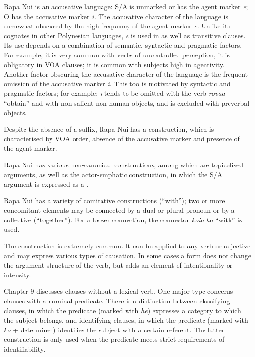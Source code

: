 Rapa Nui is an accusative language: S/A is unmarked or has the agent marker \textit{e}; O has the accusative marker \textit{i.} The accusative character of the language is somewhat obscured by the high frequency of the agent marker \textit{e}. Unlike its cognates in other Polynesian languages, \textit{e} is used in  as well as transitive clauses. Its use depends on a combination of semantic, syntactic and pragmatic factors. For example, it is very common with verbs of uncontrolled perception; it is obligatory in VOA clauses; it is common with subjects high in agentivity. Another factor obscuring the accusative character of the language is the frequent omission of the accusative marker \textit{i}. This too is motivated by syntactic and pragmatic factors; for example: \textit{i} tends to be omitted with the verb \textit{rova{\ꞌ}a} “obtain” and with non-salient non-human objects, and is excluded with preverbal objects.

Despite the absence of a  suffix, Rapa Nui has a  construction, which is characterised by VOA order, absence of the accusative marker and presence of the agent marker. 

Rapa Nui has various non-canonical constructions, among which are topicalised arguments, as well as the actor-emphatic construction, in which the S/A argument is expressed as a .

Rapa Nui has a variety of comitative constructions (“with”); two or more concomitant elements may be connected by a dual or plural pronoun or by a collective  (“together”). For a looser connection, the connector \textit{koia ko} “with” is used. 

The  construction is extremely common. It can be applied to any verb or adjective and may express various types of causation. In some cases a  form does not change the argument structure of the verb, but adds an element of intentionality or intensity.

\medskip Chapter 9 discusses clauses without a lexical verb. One major type concerns clauses with a nominal predicate. There is a distinction between classifying clauses, in which the predicate (marked with \textit{he}) expresses a category to which the subject belongs, and identifying clauses, in which the predicate (marked with \textit{ko} + determiner) identifies the subject with a certain referent. The latter construction is only used when the predicate meets strict requirements of identifiability.

